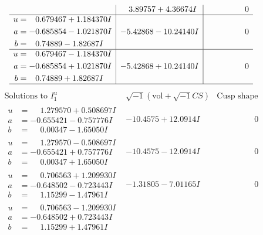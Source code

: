 \documentclass[1p]{elsarticle_modified}
\theoremstyle{definition}
\newcommand{\I}{\sqrt{-1}}
\begin{document}
$$\begin{array}{c|c|c}
 & \phantom{-}3.89757 + 4.36674 I & \phantom{-0.000000 } 0 \\ \hline\begin{aligned}
u &= \phantom{-}0.679467 + 1.184370 I \\
a &= -0.685854 - 1.021870 I \\
b &= \phantom{-}0.74889 - 1.82687 I\end{aligned}
 & -5.42868 - 10.24140 I & \phantom{-0.000000 } 0 \\ \hline\begin{aligned}
u &= \phantom{-}0.679467 - 1.184370 I \\
a &= -0.685854 + 1.021870 I \\
b &= \phantom{-}0.74889 + 1.82687 I\end{aligned}
 & -5.42868 + 10.24140 I & \phantom{-0.000000 } 0\\
 \hline 
 \end{array}$$\newpage$$\begin{array}{c|c|c}  
\text{Solutions to }I^u_{1}& \I (\text{vol} + \sqrt{-1}CS) & \text{Cusp shape}\\
 \hline 
\begin{aligned}
u &= \phantom{-}1.279570 + 0.508697 I \\
a &= -0.655421 - 0.757776 I \\
b &= \phantom{-}0.00347 - 1.65050 I\end{aligned}
 & -10.4575 + 12.0914 I & \phantom{-0.000000 } 0 \\ \hline\begin{aligned}
u &= \phantom{-}1.279570 - 0.508697 I \\
a &= -0.655421 + 0.757776 I \\
b &= \phantom{-}0.00347 + 1.65050 I\end{aligned}
 & -10.4575 - 12.0914 I & \phantom{-0.000000 } 0 \\ \hline\begin{aligned}
u &= \phantom{-}0.706563 + 1.209930 I \\
a &= -0.648502 - 0.723443 I \\
b &= \phantom{-}1.15299 - 1.47961 I\end{aligned}
 & -1.31805 - 7.01165 I & \phantom{-0.000000 } 0 \\ \hline\begin{aligned}
u &= \phantom{-}0.706563 - 1.209930 I \\
a &= -0.648502 + 0.723443 I \\
b &= \phantom{-}1.15299 + 1.47961 I\end{aligned}

\end{array}$$
\end{document}
